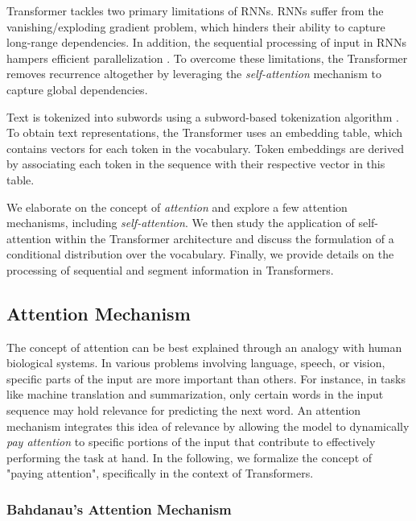 
Transformer \citep{vaswani2017attention} tackles two primary limitations of \acp{RNN}. \acp{RNN} suffer from the vanishing/exploding gradient problem, which hinders their ability to capture long-range dependencies. In addition, the sequential processing of input in \acp{RNN} hampers efficient parallelization \citep{vaswani2017attention}. To overcome these limitations, the Transformer removes recurrence altogether by leveraging the \textit{self-attention} mechanism to capture global dependencies. 

Text is tokenized into subwords using a subword-based tokenization algorithm \citep{gage1994new, wu2016google}. To obtain text representations, the Transformer uses an embedding table, which contains vectors for each token in the vocabulary. Token embeddings are derived by associating each token in the sequence with their respective vector in this table.

We elaborate on the concept of \textit{attention} and explore a few attention mechanisms, including \textit{self-attention}. We then study the application of self-attention within the Transformer architecture and discuss the formulation of a conditional distribution over the vocabulary. Finally, we provide details on the processing of sequential and segment information in Transformers.

\subsection{Attention Mechanism} 

The concept of attention can be best explained through an analogy with human biological systems. In various problems involving language, speech, or vision, specific parts of the input are more important than others. For instance, in tasks like machine translation and summarization, only certain words in the input sequence may hold relevance for predicting the next word. An attention mechanism integrates this idea of relevance by allowing the model to dynamically \textit{pay attention} to specific portions of the input that contribute to effectively performing the task at hand. In the following, we formalize the concept of "paying attention", specifically in the context of Transformers.

\subsubsection{Bahdanau's Attention Mechanism} 


